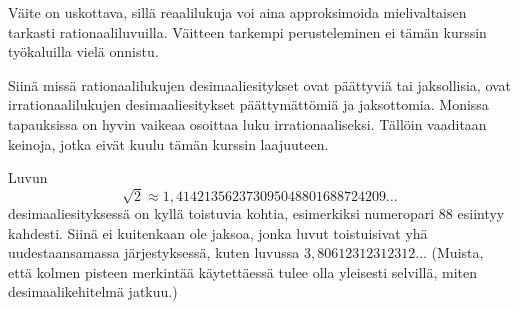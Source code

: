 
Väite on uskottava, sillä reaalilukuja voi aina approksimoida mielivaltaisen tarkasti rationaaliluvuilla. Väitteen tarkempi perusteleminen ei tämän kurssin työkaluilla vielä onnistu.

Siinä missä rationaalilukujen desimaaliesitykset ovat päättyviä tai jaksollisia, ovat irrationaalilukujen desimaaliesitykset päättymättömiä ja jaksottomia. Monissa tapauksissa on hyvin vaikeaa osoittaa luku irrationaaliseksi. Tällöin vaaditaan keinoja, jotka eivät kuulu tämän kurssin laajuuteen.

Luvun
\[\sqrt{2} \approx 1,414213562373095048801688724209\ldots\]
desimaaliesityksessä on kyllä toistuvia kohtia, esimerkiksi numeropari $88$ esiintyy kahdesti. Siinä ei kuitenkaan ole jaksoa, jonka luvut toistuisivat yhä uudestaansamassa järjestyksessä, kuten luvussa $3,80612312312312\ldots$ (Muista, että kolmen pisteen merkintää käytettäessä tulee olla yleisesti selvillä, miten desimaalikehitelmä jatkuu.)